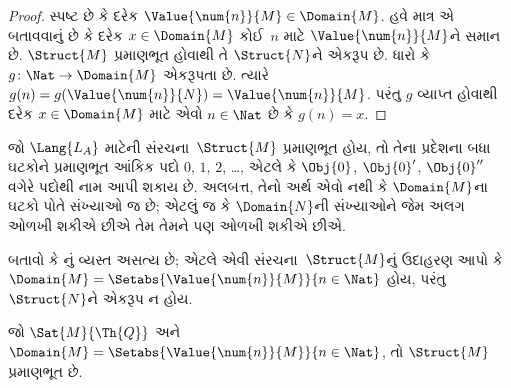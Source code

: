 \begin{proof}
સ્પષ્ટ છે કે દરેક $\Value{\num{n}}{M}\in\Domain{M}$. હવે માત્ર એ
બતાવવાનું છે કે દરેક $x\in\Domain{M}$ કોઈ~$n$ માટે
$\Value{\num{n}}{M}$ને સમાન છે. $\Struct{M}$ પ્રમાણભૂત હોવાથી તે
$\Struct{N}$ને એકરૂપ છે. ધારો કે $g\colon\Nat\to\Domain{M}$ એકરૂપતા
છે. ત્યારે
$g(n)=g(\Value{\num{n}}{N})=\Value{\num{n}}{M}$. પરંતુ $g$
વ્યાપ્ત હોવાથી દરેક $x\in\Domain{M}$ માટે એવો $n\in\Nat$ છે
કે $g(n)=x$.
\end{proof}

\begin{explain}
જો $\Lang{L_A}$ માટેની સંરચના~$\Struct{M}$ પ્રમાણભૂત હોય, તો તેના
પ્રદેશના બધા ઘટકોને પ્રમાણભૂત આંકિક પદો $\num{0}$, $\num{1}$,
$\num{2}$, \dots, એટલે કે $\Obj{0}$, $\Obj{0}'$, $\Obj{0}''$ વગેરે
પદોથી નામ આપી શકાય છે. અલબત્ત, તેનો અર્થ એવો નથી કે
$\Domain{M}$ના ઘટકો પોતે સંખ્યાઓ જ છે; એટલું જ કે
$\Domain{N}$ની સંખ્યાઓને જેમ અલગ ઓળખી શકીએ છીએ તેમ તેમને પણ ઓળખી
શકીએ છીએ.
\end{explain}

\begin{prob}
બતાવો કે નું વ્યસ્ત અસત્ય છે;
એટલે એવી સંરચના~$\Struct{M}$નું ઉદાહરણ આપો કે
$\Domain{M}=\Setabs{\Value{\num{n}}{M}}{n\in\Nat}$ હોય, પરંતુ
$\Struct{N}$ને એકરૂપ ન હોય.
\end{prob}

\begin{prop}
જો $\Sat{M}{\Th{Q}}$ અને
$\Domain{M}=\Setabs{\Value{\num{n}}{M}}{n\in\Nat}$, તો
$\Struct{M}$ પ્રમાણભૂત છે.
\end{prop}

